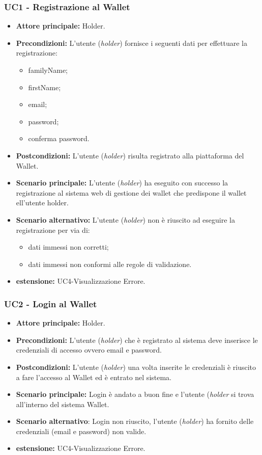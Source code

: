 \subsubsection{UC1 - Registrazione al Wallet}
\begin{itemize}
\item \textbf{Attore principale:} Holder.
\item \textbf{Precondizioni:} L’utente (\textit{holder}) fornisce i seguenti dati per effettuare la registrazione:
\begin{itemize}
    \item familyName;
    \item firstName;
    \item email;
    \item password;
    \item conferma password.
\end{itemize}
\item \textbf{Postcondizioni:} L’utente (\textit{holder}) risulta registrato alla piattaforma del Wallet.
\item \textbf{Scenario principale:} L'utente (\textit{holder}) ha eseguito con successo la registrazione al sistema web di gestione dei wallet che predispone il wallet ell'utente holder.
\item \textbf{Scenario alternativo:} L'utente (\textit{holder}) non è riuscito ad eseguire la registrazione per via di:
\begin{itemize}
    \item dati immessi non corretti;
    \item dati immessi non conformi alle regole di validazione.
\end{itemize}
\item \textbf{estensione:} UC4-Visualizzazione Errore.
\end{itemize}

\subsubsection{UC2 - Login al Wallet}
\begin{itemize}
\item \textbf{Attore principale:} Holder.
\item \textbf{Precondizioni:} L'utente (\textit{holder}) che è registrato al sistema deve inserisce le credenziali di accesso ovvero email e password.
\item \textbf{Postcondizioni:} L'utente (\textit{holder}) una volta inserite le credenziali è riuscito a fare l'accesso al Wallet ed è entrato nel sistema.
\item \textbf{Scenario principale:} Login è andato a buon fine e l'utente  (\textit{holder} si trova all'interno del sistema Wallet.
\item \textbf{Scenario alternativo}: Login non riuscito, l'utente (\textit{holder}) ha fornito delle credenziali (email e password) non valide.
\item \textbf{estensione:} UC4-Visualizzazione Errore.
\end{itemize}

